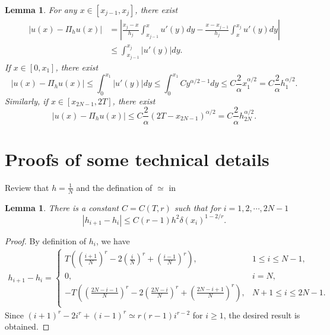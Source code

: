 \documentclass{amsart}
\newtheorem{lemma}[theorem]{Lemma}
\theoremstyle{definition}
\theoremstyle{remark}
\numberwithin{equation}{section}
\begin{document}
\begin{lemma} \label{lmm:Dyj1}
  For any \(x\in [x_{j-1}, x_j]\), there exist
  \begin{equation*}
    \begin{aligned}
      |u(x) - \Pi_hu(x)| & = \left| \frac{x_{j}-x}{h_j} \int_{x_{j-1}}^x u'(y) dy - \frac{x-x_{j-1}}{h_j} \int_{x}^{x_{j}} u'(y) dy \right| \\
                      & \le \int_{x_{j-1}}^{x_{j}} |u'(y)| dy.
    \end{aligned}
  \end{equation*}
  If \(x\in [0, x_1]\), there exist %
  \begin{equation*}
    |u(x) - \Pi_hu(x)| \le \int_{0}^{x_1} |u'(y)| dy \le \int_{0}^{x_1} C y^{\alpha/2-1} dy  \le C\frac{2}{\alpha} x_1^{\alpha/2} = C\frac{2}{\alpha} h_1^{\alpha/2} .
  \end{equation*}
  Similarly, if \(x\in [x_{2N-1}, 2T]\), there exist
  \begin{equation*}
    |u(x) - \Pi_hu(x)| \le C\frac{2}{\alpha} (2T-x_{2N-1})^{\alpha/2} = C\frac{2}{\alpha} h_{2N}^{\alpha/2} .
  \end{equation*}
\end{lemma}





\section{Proofs of some technical details}

Review that \(h=\frac{1}{N}\) and the defination of \(\simeq\) in 




\begin{lemma} \label{lmm:hi1-hi}
There is a constant \(C=C(T,r)\) such that for \(i=1,2,\cdots,2N-1\)
\begin{equation*}
  |h_{i+1} - h_{i}| \le C(r-1) h^2 \delta(x_i)^{1-2/r} .
\end{equation*}
\end{lemma}
\begin{proof}
By definition of $h_i$, we have
\begin{equation*}
  \begin{aligned}
    h_{i+1} - h_{i} =
    \begin{cases}
      T \left( \left(\frac{i+1}{N}\right)^r - 2\left(\frac{i}{N}\right)^r + \left(\frac{i-1}{N}\right)^r  \right) ,           & 1\le i\le N-1,    \\
      0,    & i=N,    \\
      -T \left( \left(\frac{2N-i-1}{N}\right)^r - 2\left(\frac{2N-i}{N}\right)^r + \left(\frac{2N-i+1}{N}\right)^r  \right) , & N+1\le i\le 2N-1 .    \\
    \end{cases}
  \end{aligned}
\end{equation*}
Since $(i+1)^r - 2i^r + (i-1)^r \simeq r(r-1)i^{r-2}$ for $i\ge 1$,
the desired result is obtained.
\end{proof}
\end{document}
